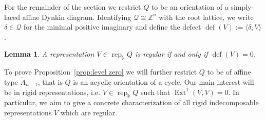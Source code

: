 \documentclass[12pt]{amsart}
\newcommand{\ZZ}{\mathbb{Z}}
\newcommand{\kk}{\Bbbk}%
\newcommand{\cQ}{\mathcal{Q}}
\newcommand{\defect}{\operatorname{def}}
\newcommand{\rep}{\operatorname{rep}}
\DeclareMathOperator{\Ext}{Ext}
\newtheorem{lemma}[theorem]{Lemma}
\theoremstyle{remark}
\numberwithin{equation}{section}
\begin{document}
  For the remainder of the section we restrict $Q$ to be an orientation of a simply-laced affine Dynkin diagram.
  Identifying $\cQ\cong\ZZ^n$ with the root lattice, we write $\delta\in\cQ$ for the minimal positive imaginary and define the defect $\defect(V):=\langle\delta,V\rangle$.
  \begin{lemma}\cite{ASS06}
      A representation $V\in\rep_\kk Q$ is regular if and only if $\defect(V)=0$.
  \end{lemma}

  To prove Proposition~\ref{prop:level zero} we will further restrict $Q$ to be of affine type $\tilde{A}_{n-1}$, that is $Q$ is an acyclic orientation of a cycle.  
  Our main interest will be in rigid representations, i.e. $V\in\rep_\kk Q$ such that $\Ext^1(V,V)=0$.  
  In particular, we aim to give a concrete characterization of all rigid indecomposable representations $V$ which are regular.
\end{document}
